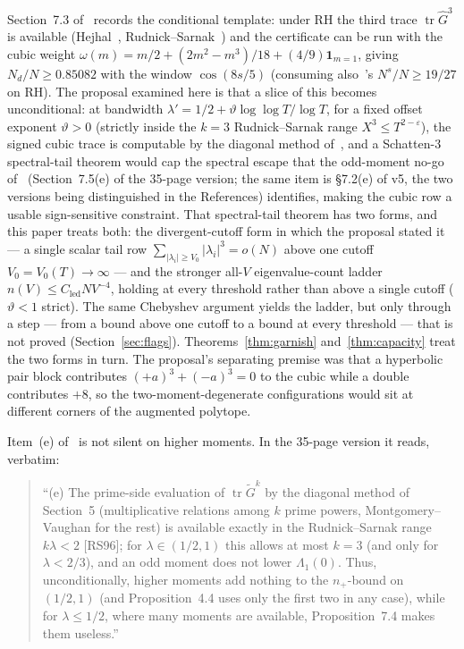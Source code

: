 \documentclass[11pt]{article}
\theoremstyle{plain}
\theoremstyle{definition}
\theoremstyle{remark}
\newcommand{\Gh}{\widehat{G}}
\newcommand{\tr}{\operatorname{tr}}
\newcommand{\Cled}{C_{\mathrm{led}}}
\newcommand{\Nd}{N_{d}}
\newcommand{\one}{\mathbf{1}}
\begin{document}
Section~7.3 of~\cite{AF26} records the conditional template: under RH the third
trace $\tr \Gh^3$ is available (Hejhal~\cite{Hej94}, Rudnick--Sarnak~\cite{RS96})
and the certificate can
be run with the cubic weight
$\omega(m) = m/2 + (2m^2 - m^3)/18 + (4/9)\one_{m = 1}$, giving
$\Nd/N \ge 0.85082$ with the window $\cos(8s/5)$ (consuming also~\cite{BHB13}'s
$N^s/N \ge 19/27$ on RH). The proposal examined here is that a slice of this
becomes
unconditional: at bandwidth
$\lambda' = 1/2 + \vartheta \log\log T/\log T$, for a fixed offset exponent
$\vartheta > 0$ (strictly inside the $k = 3$
Rudnick--Sarnak range $X^3 \le T^{2 - \varepsilon}$), the signed cubic trace is
computable by the diagonal method of~\cite[\S5]{AF26}, and a Schatten-$3$
spectral-tail theorem would cap the spectral escape that the odd-moment no-go
of~\cite{AF26} (Section~7.5(e) of the 35-page version; the same item is
\S7.2(e) of v5, the two versions being distinguished in the References)
identifies, making the cubic row a usable sign-sensitive constraint.
That spectral-tail theorem has two forms, and this paper treats both: the
divergent-cutoff form in which the proposal stated it --- a single scalar tail
row $\sum_{|\lambda_i| \ge V_0} |\lambda_i|^3 = o(N)$ above one cutoff
$V_0 = V_0(T) \to \infty$ --- and the stronger all-$V$ eigenvalue-count ladder
$n(V) \le \Cled N V^{-4}$, holding at every threshold rather than above a single
cutoff ($\vartheta < 1$ strict). The same Chebyshev argument yields the ladder,
but only through a step --- from a bound above one cutoff to a bound at every
threshold --- that is not proved (Section~\ref{sec:flags}).
Theorems~\ref{thm:garnish} and~\ref{thm:capacity} treat the two forms in turn.
The proposal's separating premise was that a
hyperbolic pair block contributes $(+a)^3 + (-a)^3 = 0$ to the cubic while a
double contributes $+8$, so the two-moment-degenerate configurations would sit
at different corners of the augmented polytope.

Item~(e) of~\cite{AF26} is not silent on higher moments. In the 35-page version
it reads, verbatim:

\begin{quote}
``(e) The prime-side evaluation of $\tr \widetilde{G}^k$ by the diagonal method
of Section~5 (multiplicative relations among $k$ prime powers,
Montgomery--Vaughan for the rest) is available exactly in the Rudnick--Sarnak
range $k\lambda < 2$ [RS96]; for $\lambda \in (1/2, 1)$ this allows at most
$k = 3$ (and only for $\lambda < 2/3$), and an odd moment does not lower
$\Lambda_1(0)$. Thus, unconditionally, higher moments add nothing to the
$n_+$-bound on $(1/2, 1)$ (and Proposition~4.4 uses only the first two in any
case), while for $\lambda \le 1/2$, where many moments are available,
Proposition~7.4 makes them useless.''
\end{quote}
\end{document}
